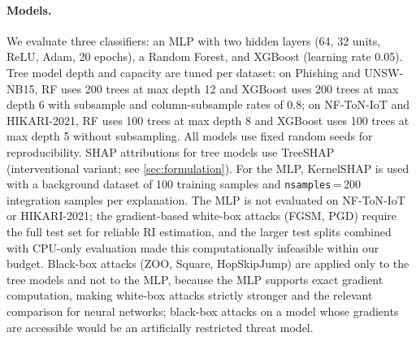 \documentclass[runningheads]{llncs}
\begin{document}
\paragraph{Models.}
We evaluate three classifiers: an MLP with two hidden layers (64, 32 units, ReLU,
Adam, 20 epochs), a Random Forest, and XGBoost (learning rate 0.05).
Tree model depth and capacity are tuned per dataset: on Phishing and UNSW-NB15,
RF uses 200 trees at max depth 12 and XGBoost uses 200 trees at max depth 6 with
subsample and column-subsample rates of 0.8; on NF-ToN-IoT and HIKARI-2021,
RF uses 100 trees at max depth 8 and XGBoost uses 100 trees at max depth 5
without subsampling.  All models use fixed random seeds for reproducibility.
SHAP attributions for tree models use TreeSHAP~\cite{lundberg2020treeshap}
(interventional variant; see \cref{sec:formulation}).  For the MLP, KernelSHAP is used with a
background dataset of 100 training samples and \texttt{nsamples}\,=\,200
integration samples per explanation.  The MLP is not evaluated on NF-ToN-IoT
or HIKARI-2021; the gradient-based white-box attacks (FGSM, PGD) require the
full test set for reliable RI estimation, and the larger test splits combined with
CPU-only evaluation made this computationally infeasible within our budget.
Black-box attacks (ZOO, Square, HopSkipJump) are applied only to the tree models
and not to the MLP, because the MLP supports exact gradient computation, making
white-box attacks strictly stronger and the relevant comparison for neural networks;
black-box attacks on a model whose gradients are accessible would be an artificially
restricted threat model.
\end{document}
